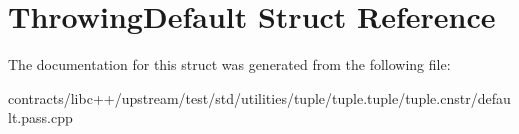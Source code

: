 \hypertarget{struct_throwing_default}{}\section{Throwing\+Default Struct Reference}
\label{struct_throwing_default}


The documentation for this struct was generated from the following file\+:\begin{DoxyCompactItemize}
\item 
contracts/libc++/upstream/test/std/utilities/tuple/tuple.\+tuple/tuple.\+cnstr/default.\+pass.\+cpp\end{DoxyCompactItemize}
